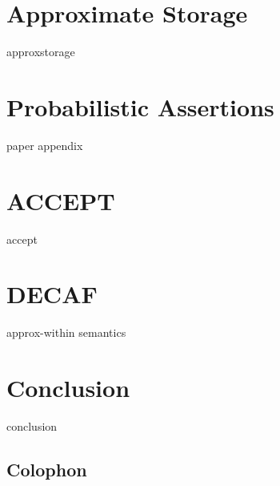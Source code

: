 \documentclass[ twoside,openright,titlepage,numbers=noenddot,headinclude,
                footinclude=true,cleardoublepage=empty,abstractoff,%
                BCOR=5mm,paper=letter,fontsize=11pt,letterpaper,%
                american,%
                ]{scrreprt}
\newcounter{dummy}
\begin{document}
\chapter{Approximate Storage}
\label{ch:approxstorage}
{approxstorage}


\chapter{Probabilistic Assertions}
\label{ch:passert}
{paper}
{appendix}


\chapter{ACCEPT}
\label{ch:accept}
{accept}


\chapter{DECAF}
\label{ch:decaf}
{approx-within}
{semantics}


\chapter{Conclusion}
\label{ch:conclusion}
{conclusion}


\manualmark
\markboth{\spacedlowsmallcaps{\bibname}}{\spacedlowsmallcaps{\bibname}} %
{}

\label{app:bibliography}



\cleardoublepage
\pagestyle{empty}
\vspace*{20ex}
\section*{Colophon}

\end{document}
